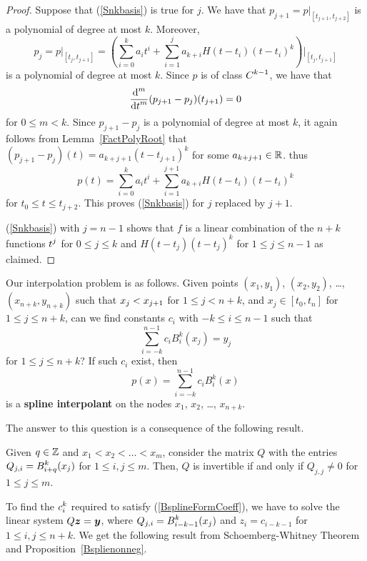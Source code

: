 \begin{proof}
Suppose that (\ref{Snkbasis}) is true for $j$.
We have that $p_{j+1} = p\big|_{[t_{j+1},t_{j+2}]}$ is a polynomial
of degree at most $k$.  Moreover,
\[
p_j = p\big|_{[t_j,t_{j+1}]} = \left( \sum_{i=0}^k a_i t^i
+ \sum_{i=1}^j a_{k+i}H(t-t_i)(t-t_i)^k\right)\bigg|_{[t_j,t_{j+1}]}
\]
is a polynomial of degree at most $k$.  Since $p$ is of class
$\DS C^{k-1}$, we have that
\[
  \dfdxn{(p_{j+1} - p_j)}{t}{m}(t_{j+1}) = 0
\]
for $0 \leq m < k$.  Since $p_{j+1}-p_j$ is a polynomial of degree at
most $k$, it again follows from
Lemma~\ref{FactPolyRoot} that
$(p_{j+1}-p_j)(t) = a_{k+j+1} (t- t_{j+1})^k$ for some $a_{k+j+1} \in \RR$.
thus
\[
  p(t) =  \sum_{i=0}^k a_i t^i + \sum_{i=1}^{j+1} a_{k+i}H(t-t_i)(t-t_i)^k
\]
for $t_0 \leq t \leq t_{j+2}$.  This proves (\ref{Snkbasis}) for $j$
replaced by $j+1$.

(\ref{Snkbasis}) with $j=n-1$ shows that $f$ is a linear combination
of the $n+k$ functions $\DS t^j$ for $0\leq j \leq k$ and
$H(t-t_j)(t-t_j)^k$ for $1\leq j \leq n-1$ as claimed.
\end{proof}

Our interpolation problem is as follows.   Given points
$(x_1,y_1)$, $(x_2,y_2)$, \ldots, $(x_{n+k},y_{n+k})$
such that $\DS x_j < x_{j+1}$ for $1\leq j < n+k$, and
$ x_j \in[t_0,t_n]$ for $1\leq j \leq n+k$,
can we find constants $c_i$ with $-k \leq i \leq n-1$ such that
\begin{equation}\label{BsplineFormCoeff}
\sum_{i=-k}^{n-1} c_i B_i^k(x_j) = y_j
\end{equation}
for $1\leq j \leq n+ k$?   If such $c_i$ exist, then
\begin{equation}\label{BsplineForm}
p(x) = \sum_{i=-k}^{n-1} c_i B_i^k(x)
\end{equation}
is a
{\bfseries spline interpolant} on
the nodes $x_1$, $x_2$, \ldots, $x_{n+k}$.

The answer to this question is a consequence of the following result.

\begin{theorem}
Given $q \in \ZZ$ and $x_1 < x_2 < \ldots < x_m$, consider the
 matrix $Q$ with the entries
$\DS Q_{j,i} = B_{i+q}^k(x_j)$ for
$1 \leq i,j \leq m$.  Then, $Q$ is invertible if and only if
$Q_{j,j} \neq 0$ for $1 \leq j \leq m$.
\end{theorem}

To find the $\DS c_i^k$ required to satisfy
(\ref{BsplineFormCoeff}), we
have to solve the linear system $Q \VEC{z} = \VEC{y}$, where
$\DS Q_{j,i} = B_{i-k-1}^k(x_j)$ and $z_i = c_{i-k-1}$ 
for $1\leq i,j \leq n+k$.  We get the following result from
Schoemberg-Whitney Theorem and Proposition~\ref{Bsplienonneg}.


